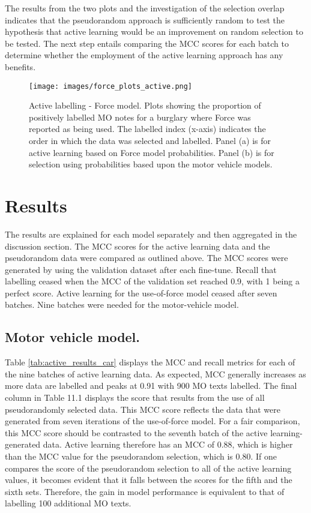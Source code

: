 The results from the two plots and the investigation of the selection overlap indicates that the pseudorandom approach is sufficiently random to test the hypothesis that active learning would be an improvement on random selection to be tested. The next step entails comparing the MCC scores for each batch to determine whether the employment of the active learning approach has any benefits.



\begin{figure}[!ht]
  \centering
    \texttt{[image: images/force\_plots\_active.png]}
    \caption[Active labelling - Force model.]{{Active labelling - Force model.} Plots showing the proportion of positively labelled MO notes for a burglary where Force was reported as being used. The labelled index (x-axis) indicates the order in which the data was selected and labelled. Panel (a) is for active learning based on Force model probabilities. Panel (b) is for selection using probabilities based upon the motor vehicle models.}
    \label{fig:active_force}
\end{figure}


\section{Results} The results are explained for each model separately and then aggregated in the discussion section. The MCC scores for the active learning data and the pseudorandom data were compared as outlined above. The MCC scores were generated by using the validation dataset after each fine-tune. Recall that labelling ceased when the MCC of the validation set reached 0.9, with 1 being a perfect score. Active learning for the use-of-force model ceased after seven batches. Nine batches were needed for the motor-vehicle model. 

\subsection{Motor vehicle model.} Table \ref{tab:active_results_car} displays the MCC and recall metrics for each of the nine batches of active learning data. As expected, MCC generally increases as more data are labelled and peaks at 0.91 with 900 MO texts labelled. The final column in Table 11.1 displays the score that results from the use of all pseudorandomly selected data. This MCC score reflects the data that were generated from seven iterations of the use-of-force model. For a fair comparison, this MCC score should be contrasted to the seventh batch of the active learning-generated data. Active learning therefore has an MCC of 0.88, which is higher than the MCC value for the pseudorandom selection, which is 0.80. If one compares the score of the pseudorandom selection to all of the active learning values, it becomes evident that it falls between the scores for the fifth and the sixth sets. Therefore, the gain in model performance is equivalent to that of labelling 100 additional MO texts.

